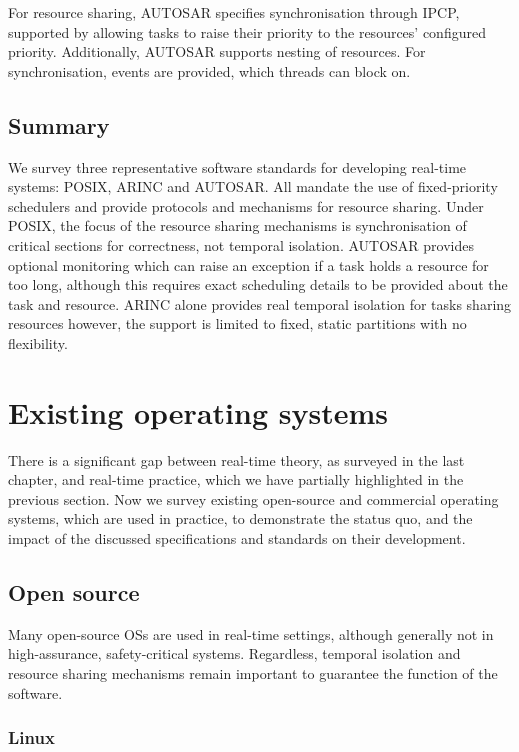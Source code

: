 For resource sharing, AUTOSAR specifies synchronisation through \gls{IPCP}, supported by allowing
tasks to raise their priority to the resources' configured priority. Additionally, AUTOSAR supports
nesting of resources. For synchronisation, events are provided, which threads can block on.

\subsection{Summary}

We survey three representative software standards for developing real-time systems: POSIX, ARINC and AUTOSAR. All mandate the use of fixed-priority schedulers 
and provide protocols and mechanisms for resource sharing. Under POSIX, 
the focus of the resource sharing mechanisms is synchronisation of critical sections for
correctness, not temporal isolation. AUTOSAR provides optional monitoring which can raise an
exception if a task holds a resource for too long, although this requires exact scheduling
details to be provided about the task and resource. ARINC alone provides real temporal isolation for
tasks sharing resources however, the support is limited to fixed, static
partitions with no flexibility.

\section{Existing operating systems}

There is a significant gap between real-time theory, as surveyed in the last chapter, and real-time
practice, which we have partially highlighted in the previous section. Now we survey existing open-source
and commercial operating systems, which are used in practice, to demonstrate the status quo, and 
the impact of the discussed specifications and standards on their development.

\subsection{Open source}

Many open-source \glspl{OS} are used in real-time settings, although generally not in
high-assurance, safety-critical systems. Regardless, temporal isolation and resource sharing mechanisms remain important to
guarantee the function of the software.

\subsubsection{Linux}

